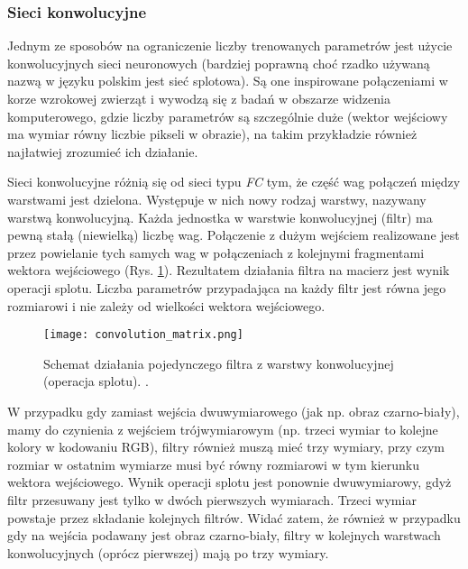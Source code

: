 \subsubsection*{Sieci konwolucyjne}
Jednym ze sposobów na ograniczenie liczby trenowanych parametrów jest użycie konwolucyjnych sieci neuronowych \cite{krizhevsky2012imagenet} (bardziej poprawną choć rzadko używaną nazwą w języku polskim jest sieć splotowa). Są one inspirowane połączeniami w korze wzrokowej zwierząt i wywodzą się z badań w obszarze widzenia komputerowego, gdzie liczby parametrów są szczególnie duże (wektor wejściowy ma wymiar równy liczbie pikseli w obrazie), na takim przykładzie również najłatwiej zrozumieć ich działanie.

Sieci konwolucyjne różnią się od sieci typu \textit{FC} tym, że część wag połączeń między warstwami jest dzielona. Występuje w nich nowy rodzaj warstwy, nazywany warstwą konwolucyjną. Każda jednostka w warstwie konwolucyjnej (filtr) ma pewną stałą (niewielką) liczbę wag. Połączenie z dużym  wejściem realizowane jest przez powielanie tych samych wag w połączeniach z kolejnymi fragmentami wektora wejściowego (Rys. \ref{fig:convolution}). Rezultatem działania filtra na macierz jest wynik operacji splotu. Liczba parametrów przypadająca na każdy filtr jest równa jego rozmiarowi i nie zależy od wielkości wektora wejściowego. 

\begin{figure}[ht]
	\centering
	\texttt{[image: convolution\_matrix.png]}
	\caption{Schemat działania pojedynczego filtra z warstwy konwolucyjnej (operacja splotu). .}
	\label{fig:convolution}
\end{figure}

W przypadku gdy zamiast wejścia dwuwymiarowego (jak np. obraz czarno-biały), mamy do czynienia z wejściem trójwymiarowym (np. trzeci wymiar to kolejne kolory w kodowaniu RGB), filtry również muszą mieć trzy wymiary, przy czym rozmiar w ostatnim wymiarze musi być równy rozmiarowi w tym kierunku wektora wejściowego. Wynik operacji splotu jest ponownie dwuwymiarowy, gdyż filtr przesuwany jest tylko w dwóch pierwszych wymiarach. Trzeci wymiar powstaje przez składanie kolejnych filtrów. Widać zatem, że również w przypadku gdy na wejścia podawany jest obraz czarno-biały, filtry w kolejnych warstwach konwolucyjnych (oprócz pierwszej) mają po trzy wymiary.

